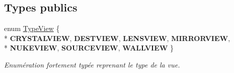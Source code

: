 \subsection*{Types publics}
\begin{DoxyCompactItemize}
\item 
\hypertarget{classElementView_ae8b9890c6c8501a7a759896cae9ab7a6}{enum \hyperlink{classElementView_ae8b9890c6c8501a7a759896cae9ab7a6}{Type\+View} \{ \\*
{\bfseries C\+R\+Y\+S\+T\+A\+L\+V\+I\+E\+W}, 
{\bfseries D\+E\+S\+T\+V\+I\+E\+W}, 
{\bfseries L\+E\+N\+S\+V\+I\+E\+W}, 
{\bfseries M\+I\+R\+R\+O\+R\+V\+I\+E\+W}, 
\\*
{\bfseries N\+U\+K\+E\+V\+I\+E\+W}, 
{\bfseries S\+O\+U\+R\+C\+E\+V\+I\+E\+W}, 
{\bfseries W\+A\+L\+L\+V\+I\+E\+W}
 \}}\label{classElementView_ae8b9890c6c8501a7a759896cae9ab7a6}

\begin{DoxyCompactList}\small\item\em Enumération fortement typée reprenant le type de la vue. \end{DoxyCompactList}\end{DoxyCompactItemize}
